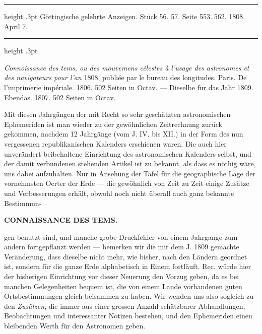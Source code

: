 \par{}\bigskip
\hypertarget{native-497-lower}{}\label{native-497-lower}
\begin{center}
\parbox{.9\linewidth}{%
\centering\small
\hrule height .3pt\relax\vspace{2.5pt}
Göttingische gelehrte Anzeigen. Stück 56. 57. Seite 553..562. 1808. April 7.\par
\vspace{2.5pt}\hrule height .3pt\relax
}
\end{center}
\par\nobreak\medskip

\emph{Connoissance des tems, ou des mouvemens célestes à l'usage des astronomes et des navigateurs pour l'an} 1808, publiée par le bureau des longitudes. Paris. De l'imprimerie impériale. 1806. 502 Seiten in Octav. --- Dieselbe für das Jahr 1809. Ebendas. 1807. 502 Seiten in Octav.

Mit diesen Jahrgängen der mit Recht so sehr geschätzten astronomischen Ephemeriden ist man wieder zu der gewöhnlichen Zeitrechnung zurück gekommen, nachdem 12 Jahrgänge (vom J. IV. bis XII.) in der Form des nun vergessenen republikanischen Kalenders erschienen waren. Die auch hier unverändert beibehaltene Einrichtung des astronomischen Kalenders selbst, und der damit verbundenen stehenden Artikel ist zu bekannt, als dass es nöthig wäre, uns dabei aufzuhalten. Nur in Ansehung der Tafel für die geographische Lage der vornehmsten Oerter der Erde --- die gewöhnlich von Zeit zu Zeit einige Zusätze und Verbesserungen erhält, obwohl noch nicht überall auch ganz bekannte Bestimmun-\par
\clearpage
\noindent{}%
\makebox[12mm][l]{}%
\parbox[t]{\dimexpr\linewidth-24mm\relax}{\centering\footnotesize\bfseries CONNAISSANCE DES TEMS.\par}%
\par\nobreak\medskip
\noindent gen benutzt sind, und manche grobe Druckfehler von einem Jahrgange zum andern fortgepflanzt werden --- bemerken wir die mit dem J. 1809 gemachte Veränderung, dass dieselbe nicht mehr, wie bisher, nach den Ländern geordnet ist, sondern für die ganze Erde alphabetisch in Einem fortläuft. Rec. würde hier der bisherigen Einrichtung vor dieser Neuerung den Vorzug geben, da es bei manchen Gelegenheiten bequem ist, die von einem Lande vorhandenen guten Ortsbestimmungen gleich beisammen zu haben. Wir wenden uns also sogleich zu den \emph{Zusätzen}, die immer aus einer grossen Anzahl schätzbarer Abhandlungen, Beobachtungen und interessanter Notizen bestehen, und den Ephemeriden einen bleibenden Werth für den Astronomen geben.

